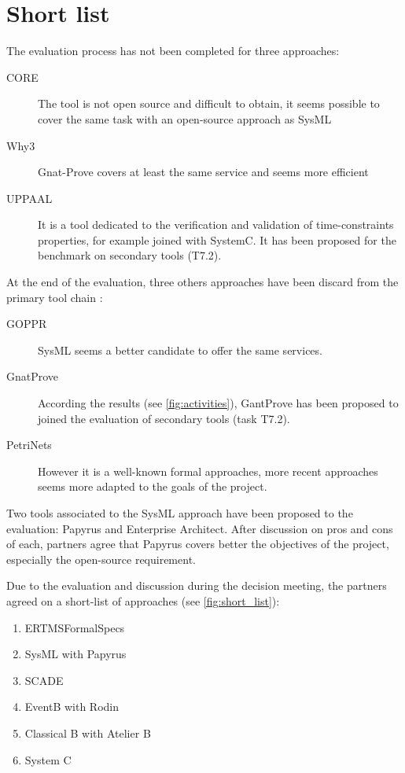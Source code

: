 \section{Short list}

The evaluation process has not been completed for three approaches:

\begin{description}
\item[CORE] The tool is not open source and difficult to obtain, it seems possible to cover the same task with an open-source approach as SysML
\item[Why3] Gnat-Prove covers at least the same service and seems more efficient
\item[UPPAAL] It is a tool dedicated to the verification and validation of time-constraints properties, for example joined with SystemC. It has been proposed for the benchmark on secondary tools (T7.2).
\end{description}

At the end of the evaluation, three others approaches have been discard from the primary tool chain :

\begin{description}
\item[GOPPR] SysML seems a better candidate to offer the same services.
\item[GnatProve] According the results (see \ref{fig:activities}), GantProve has been proposed to joined the evaluation of secondary tools (task T7.2).
\item[PetriNets] However it is a well-known formal approaches, more recent approaches seems more adapted to the goals of the project.
\end{description}

Two tools associated to the SysML approach have been proposed to the evaluation: Papyrus and Enterprise Architect. After discussion on pros and cons of each, partners agree that Papyrus covers better the objectives of the project, especially the open-source requirement. 

Due to the evaluation and discussion during the decision meeting, the partners agreed on a short-list of approaches (see \ref{fig:short_list}):


\begin{enumerate}
\item  ERTMSFormalSpecs
\item  SysML with Papyrus
\item  SCADE
\item  EventB with Rodin
\item  Classical B with Atelier B
\item  System C
\end{enumerate}
 
